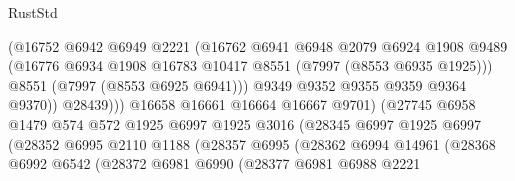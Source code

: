 \begin{lexlean}{RustStd}
\begin{coremodule}
{\begin{coremodule}
{{{{{{{{{{{{{{{{{{{{{{{{{{{{{{{{{{{{{{{{{{{                                  (@16752
                                    @6942
                                    @6949
                                    @2221
                                    (@16762
                                      @6941
                                      @6948
                                      @2079
                                      @6924
                                      @1908
                                      @9489
                                      (@16776
                                        @6934
                                        @1908
                                        @16783
                                        @10417
                                        @8551
                                        (@7997 (@8553 @6935 @1925)))
                                      @8551
                                      (@7997 (@8553 @6925 @6941)))
                                    @9349
                                    @9352
                                    @9355
                                    @9359
                                    @9364
                                    @9370))
                                @28439)))
                          @16658
                          @16661
                          @16664
                          @16667
                          @9701)
                        (@27745
                          @6958
                          @1479
                          @574
                          @572
                          @1925
                          @6997
                          @1925
                          @3016
                          (@28345
                            @6997
                            @1925
                            @6997
                            (@28352
                              @6995
                              @2110
                              @1188
                              (@28357
                                @6995
                                (@28362
                                  @6994
                                  @14961
                                  (@28368
                                    @6992
                                    @6542
                                    (@28372
                                      @6981
                                      @6990
                                      (@28377
                                        @6981
                                        @6988
                                        @2221
}}}}}}}}}}}}}}}}}}}}}}}}}}}}}}}}}}}}}}}}}}}
\end{coremodule}}
\end{coremodule}
\end{lexlean}
